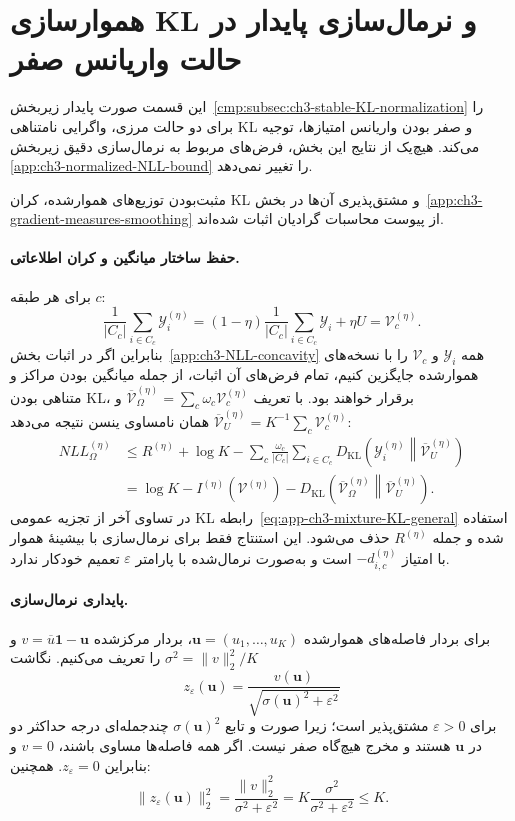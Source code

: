 \section{هموارسازی KL و نرمال‌سازی پایدار در حالت واریانس صفر}
\label{app:ch3-stable-KL-normalization}
این قسمت صورت پایدار
زیربخش~\ref{cmp:subsec:ch3-stable-KL-normalization}
را برای دو حالت مرزی، واگرایی
نامتناهی KL و صفر بودن واریانس
امتیازها، توجیه می‌کند. هیچ‌یک از
نتایج این بخش، فرض‌های مربوط به
نرمال‌سازی دقیق زیربخش
\ref{app:ch3-normalized-NLL-bound}
را تغییر نمی‌دهد.

مثبت‌بودن توزیع‌های هموارشده، کران KL و
مشتق‌پذیری آن‌ها در
بخش~\ref{app:ch3-gradient-measures-smoothing}
از پیوست محاسبات گرادیان اثبات شده‌اند.

\paragraph{حفظ ساختار میانگین و کران اطلاعاتی.}
برای هر طبقه $c$:
\[
\frac1{|C_c|}\sum_{i\in C_c}\mathscr Y_i^{(\eta)}
=(1-\eta)\frac1{|C_c|}\sum_{i\in C_c}\mathscr Y_i+\eta U
=\mathcal V_c^{(\eta)}.
\]
بنابراین اگر در اثبات
بخش~\ref{app:ch3-NLL-concavity}
همه $\mathscr Y_i$ و $\mathcal V_c$
را با نسخه‌های هموارشده جایگزین کنیم،
تمام فرض‌های آن اثبات، از جمله
میانگین بودن مراکز و متناهی بودن KL،
برقرار خواهند بود. با تعریف
$\overline{\mathcal V}^{(\eta)}_\Omega
=\sum_c\omega_c\mathcal V_c^{(\eta)}$
و
$\overline{\mathcal V}^{(\eta)}_U
=K^{-1}\sum_c\mathcal V_c^{(\eta)}$
همان نامساوی ینسن نتیجه می‌دهد:
\[
\begin{aligned}
NLL_\Omega^{(\eta)}
&\le R^{(\eta)}+\log K
-\sum_c\frac{\omega_c}{|C_c|}
\sum_{i\in C_c}
D_{\mathrm{KL}}\!\left(
\mathscr Y_i^{(\eta)}
\middle\|\overline{\mathcal V}^{(\eta)}_U\right)\\
&=\log K-I^{(\eta)}(\mathcal V^{(\eta)})
-D_{\mathrm{KL}}\!\left(
\overline{\mathcal V}^{(\eta)}_\Omega
\middle\|\overline{\mathcal V}^{(\eta)}_U\right).
\end{aligned}
\]
در تساوی آخر از تجزیه عمومی KL
رابطه~\eqref{eq:app-ch3-mixture-KL-general}
استفاده شده و جمله
$R^{(\eta)}$ حذف می‌شود.
این استنتاج فقط برای نرمال‌سازی با بیشینهٔ هموار
با امتیاز $-d_{i,c}^{(\eta)}$
است و به‌صورت نرمال‌شده با
پارامتر $\varepsilon$ تعمیم
خودکار ندارد.

\paragraph{پایداری نرمال‌سازی.}
برای بردار فاصله‌های هموارشده
$\mathbf u=(u_1,\ldots,u_K)$،
بردار مرکز‌شده
$v=\overline u\mathbf1-\mathbf u$
و $\sigma^2=\|v\|_2^2/K$
را تعریف می‌کنیم. نگاشت
\[
z_\varepsilon(\mathbf u)
=\frac{v(\mathbf u)}{\sqrt{\sigma(\mathbf u)^2+\varepsilon^2}}
\]
برای $\varepsilon>0$ مشتق‌پذیر است؛
زیرا صورت و تابع $\sigma(\mathbf u)^2$
چندجمله‌ای درجه حداکثر دو در $\mathbf u$
هستند و مخرج هیچ‌گاه صفر نیست.
اگر همه فاصله‌ها مساوی باشند،
$v=0$ و بنابراین $z_\varepsilon=0$.
همچنین:
\[
\|z_\varepsilon(\mathbf u)\|_2^2
=\frac{\|v\|_2^2}{\sigma^2+\varepsilon^2}
=K\frac{\sigma^2}{\sigma^2+\varepsilon^2}
\le K.
\]

